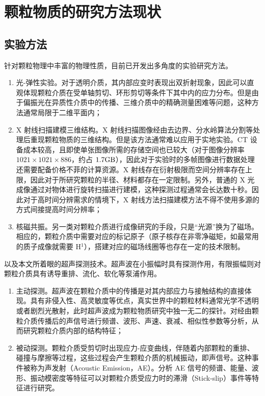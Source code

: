 \section{颗粒物质的研究方法现状}


\subsection{实验方法}

针对颗粒物理中丰富的物理性质，目前已开发出多角度的实验研究方法。

\begin{enumerate}
  \item 光-弹性实验\cite{photoelasticimetry}。对于透明介质，其内部应变时表现出双折射现象，因此可以直观体现颗粒介质在受单轴剪切、环形剪切等条件下其中内的应力分布。但是由于偏振光在异质性介质中的传播、三维介质中的精确测量困难等问题\cite{Non-Destructive_3D_Photoelasticity}，这种方法通常局限于二维平面内；
  \item X 射线扫描建模三维结构\cite{PhysRevE.68.020301}。X 射线扫描图像经由去边界、分水岭算法分割等处理后重现颗粒物质的三维结构。但是该方法通常难以应用于实地实验。CT 设备成本较高，且即使单张图像所需的存储空间也已较大（对于图像分辨率 $1021\times 1021 \times 886$，约占 $1.7\unit{\giga\byte}$），因此对于实验时的多帧图像进行数据处理还需要配备价格不菲的计算资源。X 射线存在衍射极限而空间分辨率存在上限，因此对于所研究颗粒的半径、材料都存在一定限制。另外，普通的 X 光成像通过对物体进行旋转扫描进行建模，这种探测过程通常会长达数十秒。因此对于高时间分辨需求的情境下，X 射线方法扫描建模方法不得不使用多源的方式间接提高时间分辨率；
  \item 核磁共振\cite{CLARKE2023}。另一类对颗粒介质进行成像研究的手段，只是“光源”换为了磁场。相应的，颗粒介质中需要对应的标记原子（原子核存在非零净磁矩，如最常用的质子成像就需要 H$^{1}$），搭建对应的磁场线圈等也存在一定的技术限制。
\end{enumerate}

以及本文所着眼的超声探测技术。超声波在小振幅时具有探测作用，有限振幅则对颗粒介质具有诱导重排、流化、软化\cite{PhysRevE.84.020301}等泵浦作用。%

\begin{enumerate}
  \item 主动探测。超声波在颗粒介质中的传播是对其内部应力与接触结构的直接体现\cite{PhysRevB.48.15646,Jia1999UltrasoundPI,Transitional}。具有非侵入性、高灵敏度等优点，真实世界中的颗粒材料通常光学不透明或者剧烈光散射，此时超声波成为颗粒物质研究中独一无二的探针。对经由颗粒介质传播后的声信号进行频谱、波形、声速、衰减、相似性参数等分析，从而研究颗粒介质内部的结构特征；
  \item 被动探测。颗粒介质受剪切时出现应力-应变曲线，伴随着内部颗粒的重排、碰撞与摩擦等过程，这些过程会产生颗粒介质的机械振动，即声信号。这种事件被称为声发射（Acoustic Emission，AE）。分析 AE 信号的频谱、能量、波形、振动模密度等特征\cite{PhysRevLett.120.218003,10.1029/2023JB026612,doi:10.1073/pnas.2305134120,}可以对颗粒介质受应力时的滞滑（Stick-slip）事件等特征进行研究。
\end{enumerate}

